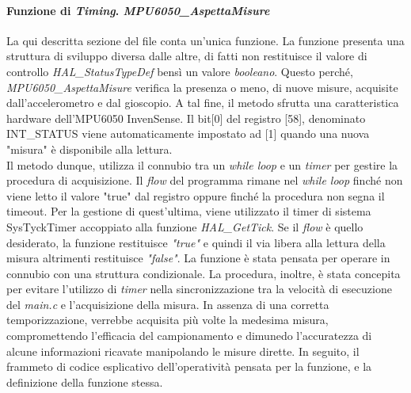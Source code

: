 \documentclass[11pt]{report}
\begin{document}
\paragraph{Funzione di \textit{Timing}. \textit{MPU6050\_AspettaMisure}}
La qui descritta sezione del file conta un'unica funzione. La funzione presenta una struttura di sviluppo diversa dalle altre, di fatti non restituisce il valore di controllo \textit{HAL\_StatusTypeDef} bensì un valore \textit{booleano}. Questo perché,
\textit{MPU6050\_AspettaMisure} verifica la presenza o meno, di nuove misure, acquisite dall'accelerometro e dal gioscopio. A tal fine, il metodo sfrutta una caratteristica hardware dell'MPU6050 InvenSense.
Il bit[0] del registro [58], denominato INT\_STATUS viene automaticamente impostato ad [1] quando una nuova "misura" è disponibile alla lettura.\\
Il metodo dunque, utilizza il connubio tra un \textit{while loop} e un \textit{timer} per gestire la procedura di acquisizione.
Il \textit{flow} del programma rimane nel \textit{while loop} finché non viene letto il valore "true" dal registro oppure finché la procedura non segna il timeout. Per la gestione di quest'ultima, viene utilizzato il timer di sistema SysTyckTimer accoppiato alla funzione \textit{HAL\_GetTick}.
Se il \textit{flow} è quello desiderato, la funzione restituisce \textit{"true"} e quindi il via libera alla lettura della misura altrimenti restituisce \textit{"false"}.
La funzione è stata pensata per operare in connubio con una struttura condizionale.
La procedura, inoltre, è stata concepita per evitare l'utilizzo di \textit{timer} nella sincronizzazione tra la velocità di esecuzione del \textit{main.c} e l'acquisizione della misura. In assenza di una corretta temporizzazione, verrebbe acquisita più volte la medesima misura, compromettendo l'efficacia del campionamento e dimunedo l'accuratezza di alcune informazioni ricavate manipolando le misure dirette.
In seguito, il frammeto di codice esplicativo dell'operatività pensata per la funzione, e la definizione della funzione stessa.


\end{document}
